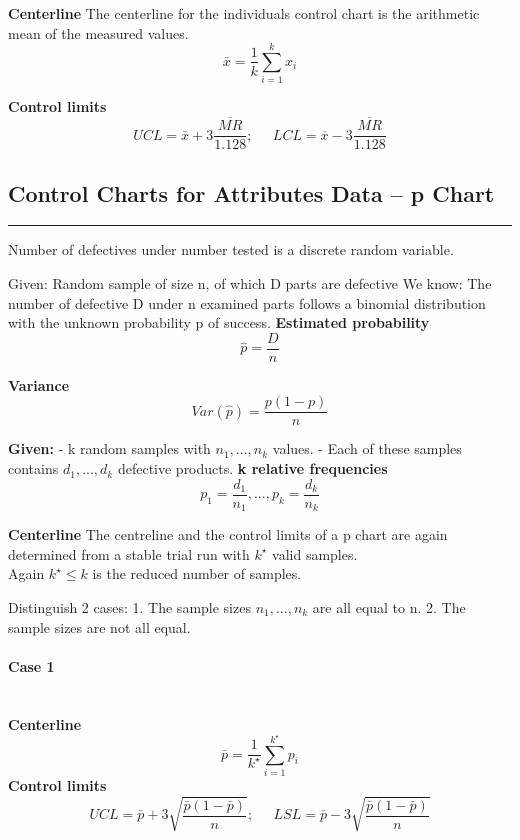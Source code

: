 \textbf{Centerline}
The centerline for the individuals control chart is the arithmetic mean of the measured values.
\begin{equation}
  \bar{x} = \frac{1}{k} \sum^k_{i=1} x_i
\end{equation}

\textbf{Control limits}
\begin{equation}
    UCL = \bar{x} + 3 \frac{\overline{MR}}{1.128}; \;\;\;\;\;  LCL = \overline{x} - 3 \frac{\overline{MR}}{1.128}
\end{equation}

\subsection{Control Charts for Attributes Data – p Chart}
\noindent\rule[\linienAbstand]{\linewidth}{\linienDicke}
Number of defectives under number tested is a discrete random variable.

Given: Random sample of size n, of which D parts are defective
We know: The number of defective D under n examined parts follows a binomial distribution with the unknown probability p of success.
\textbf{Estimated probability}
\begin{equation}
  \hat{p} = \frac{D}{n}
\end{equation}

\textbf{Variance}
\begin{equation}
  Var(\hat{p}) = \frac{p(1-p)}{n}
\end{equation}

\textbf{Given:}
- k random samples with $n_1,...,n_k$ values.
- Each of these samples contains $d_1,...,d_k$ defective products.
\textbf{k relative frequencies}
\begin{equation}
  p_1 = \frac{d_1}{n_1},...,p_k = \frac{d_k}{n_k}
\end{equation}

\textbf{Centerline}
The centreline and the control limits of a p chart are again
determined from a stable trial run with $k^\star$ valid samples.\\
Again $k^\star \leq k$ is the reduced number of samples.

Distinguish 2 cases:
1. The sample sizes $n_1,...,n_k$ are all equal to n.
2. The sample sizes are not all equal.

\paragraph{Case 1}\mbox{}\\
\textbf{Centerline}
\begin{equation}
  \bar{p} = \frac{1}{k^\star} \sum^{k^\star}_{i=1}p_i
\end{equation}
\textbf{Control limits}
\begin{equation}
  UCL = \bar{p} + 3\sqrt{\frac{\bar{p}(1-\bar{p})}{n}}; \;\;\;\;\; LSL = \bar{p} - 3\sqrt{\frac{\bar{p}(1-\bar{p})}{n}}
\end{equation}

